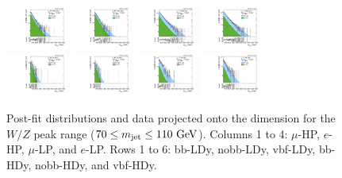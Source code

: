 \begin{figure}[htbp]
  \includegraphics[width=0.18\textwidth]{fig/fitValidation/PostFit_SR_MVV_MJJ070to110__mu_HP_nobb_HDy_Run2.pdf}
  \includegraphics[width=0.18\textwidth]{fig/fitValidation/PostFit_SR_MVV_MJJ070to110__e_HP_nobb_HDy_Run2.pdf}
  \includegraphics[width=0.18\textwidth]{fig/fitValidation/PostFit_SR_MVV_MJJ070to110__mu_LP_nobb_HDy_Run2.pdf}
  \includegraphics[width=0.18\textwidth]{fig/fitValidation/PostFit_SR_MVV_MJJ070to110__e_LP_nobb_HDy_Run2.pdf}\\
  \includegraphics[width=0.18\textwidth]{fig/fitValidation/PostFit_SR_MVV_MJJ070to110__mu_HP_vbf_HDy_Run2.pdf}
  \includegraphics[width=0.18\textwidth]{fig/fitValidation/PostFit_SR_MVV_MJJ070to110__e_HP_vbf_HDy_Run2.pdf}
  \includegraphics[width=0.18\textwidth]{fig/fitValidation/PostFit_SR_MVV_MJJ070to110__mu_LP_vbf_HDy_Run2.pdf}
  \includegraphics[width=0.18\textwidth]{fig/fitValidation/PostFit_SR_MVV_MJJ070to110__e_LP_vbf_HDy_Run2.pdf}\\
  \caption{
    Post-fit distributions and data projected onto the \MVV dimension for the $W/Z$ peak range ($70\leq\MJ\leq110\unit{GeV}$).
    Columns 1 to 4: $\mu$-HP, $e$-HP, $\mu$-LP, and $e$-LP.
    Rows 1 to 6: bb-LDy, nobb-LDy, vbf-LDy, bb-HDy, nobb-HDy, and vbf-HDy.
  }
  \label{fig:postfit_MVV_MJJ070to110_Run2}
\end{figure}

